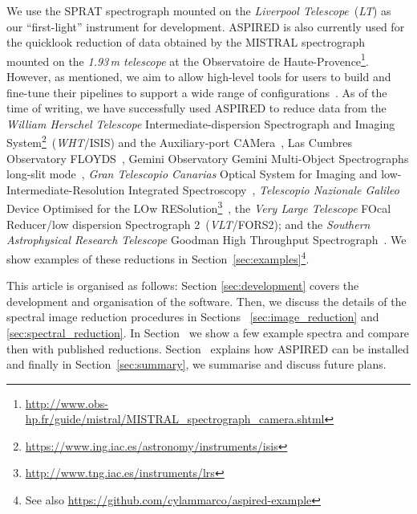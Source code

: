 \documentclass[linenumbers, twocolumn]{aastex631}
\begin{document}
We use the SPRAT spectrograph \citep{2014SPIE.9147E..8HP} mounted on the \textit{Liverpool Telescope}~(\textit{LT}) as our
``first-light'' instrument for development. \textsc{ASPIRED} is also currently used for the quicklook reduction of data obtained by the MISTRAL spectrograph
mounted on the \textit{1.93\,m telescope} at the Observatoire de
Haute-Provence\footnote{\url{http://www.obs-hp.fr/guide/mistral/MISTRAL_spectrograph_camera.shtml}}. However, as mentioned, we
aim to allow high-level tools for users to build and fine-tune their pipelines
to support a wide range of
configurations~\citep{2020arXiv201203505L, marco_2021_4463569}. As of the time
of writing, we have successfully used \textsc{ASPIRED} to reduce data from the
\textit{William Herschel Telescope} Intermediate-dispersion Spectrograph and
Imaging System\footnote{\url{https://www.ing.iac.es/astronomy/instruments/isis}}~(\textit{WHT}/ISIS)
and the Auxiliary-port CAMera~\citep[ACAM;][]{2008SPIE.7014E..6XB}, Las Cumbres
Observatory FLOYDS~\citep[Las Cumbres/FLOYDS;][]{2013PASP..125.1031B}, Gemini Observatory
Gemini Multi-Object Spectrographs long-slit
mode~\citep[Gemini/GMOS-LS;][]{2004PASP..116..425H}, \textit{Gran Telescopio Canarias}
Optical System for Imaging and low-Intermediate-Resolution Integrated
Spectroscopy~\citep[GTC/OSIRIS;][]{2000SPIE.4008..623C},  \textit{Telescopio
Nazionale Galileo} Device Optimised for the LOw
RESolution\footnote{\url{http://www.tng.iac.es/instruments/lrs}}~\citep[\textit{TNG}/DOLORES;][]{1999ldss.work..157M},
the \textit{Very Large Telescope} FOcal Reducer/low dispersion Spectrograph 2~(\textit{VLT}/FORS2); and the \textit{Southern Astrophysical Research Telescope} Goodman High Throughput Spectrograph~\citep[\textit{SOAR}/GHTS][]{2004SPIE.5492..331C}.
We show examples of these reductions in Section~\ref{sec:examples}\footnote{See
also \url{https://github.com/cylammarco/aspired-example}}. 

This article is organised as follows: Section \textsection\ref{sec:development}
covers the development and organisation of the software. Then, we discuss the
details of the spectral image reduction procedures in Sections~\textsection
\ref{sec:image_reduction} and \ref{sec:spectral_reduction}. In
Section~\textsection{\ref{sec:examples}} we show a few example spectra and
compare then with published reductions.
Section~\textsection{\ref{sec:distribution}}
explains how \textsc{ASPIRED} can be installed and finally in 
Section~\textsection\ref{sec:summary}, we summarise and discuss future
plans.
\end{document}
